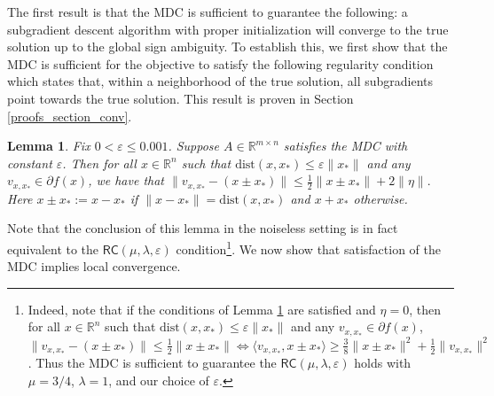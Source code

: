 \documentclass[11pt]{article}
\newcommand{\R}{\mathbb{R}}
\newcommand{\RC}{\mathsf{R}\mathsf{C}}
\renewcommand{\epsilon}{\varepsilon}
\newcommand{\dist}{\text{dist}}
\newtheorem{lemma}{Lemma}
\begin{document}
The first result is that the MDC is sufficient to guarantee the following: a subgradient descent algorithm with proper initialization will converge to the true solution up to the global sign ambiguity. To establish this, we first show that the MDC is sufficient for the objective to satisfy the following regularity condition which states that, within a neighborhood of the true solution, all subgradients point towards the true solution. This result is proven in Section \ref{proofs_section_conv}. \begin{lemma} \label{convexity_Lemma} Fix $0 < \epsilon \leqslant 0.001$. Suppose $A \in \R^{m \times n}$ satisfies the MDC with constant $\epsilon$. Then for all $x \in \R^n$ such that $\dist(x,x_*) \leqslant \epsilon\|x_*\|$ and any $v_{x,x_*} \in \partial f(x)$, we have that $\| v_{x,x_*} -  (x \pm x_*) \| \leqslant \frac{1}{2}\|x\pm x_*\| + 2\|\eta\|.$ Here $x \pm x_* := x-x_*$ if $\|x-x_*\| = \dist(x,x_*)$ and $x+x_*$ otherwise.
\end{lemma} \noindent Note that the conclusion of this lemma in the noiseless setting is in fact equivalent to the  $\RC(\mu,\lambda,\epsilon)$ condition\footnote{Indeed, note that if the conditions of Lemma \ref{convexity_Lemma} are satisfied and $\eta = 0$, then for all $x \in \R^n$ such that $\dist(x,x_*)\leqslant \epsilon\|x_*\|$ and any $v_{x,x_*} \in \partial f(x)$, 
    $\|v_{x,x_*}-(x\pm x_*)\| \leqslant \frac{1}{2}\|x\pm x_*\| \Longleftrightarrow 
    \langle v_{x,x_*},x\pm x_*\rangle  \geqslant \frac{3}{8}\|x\pm x_*\|^2 + \frac{1}{2}\|v_{x,x_*}\|^2$. Thus the MDC is sufficient to guarantee the $\RC(\mu,\lambda,\epsilon)$ holds with $\mu = 3/4$, $\lambda =1$, and our choice of $\epsilon$.}. We now show that satisfaction of the MDC implies local convergence.
\end{document}
